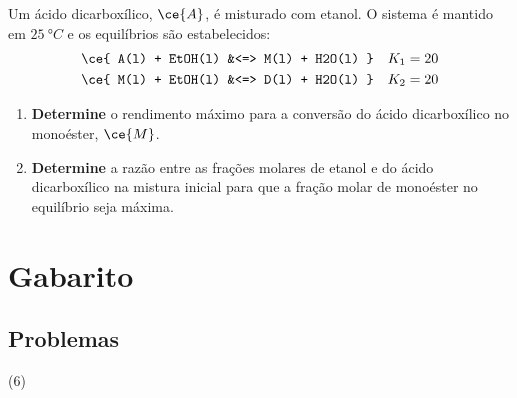 \begin{problem}[
	id={2F74},
	path={/home/braun/Documents/Developer/braunchem/data/problems/Q2/2F/2F74}
]
Um ácido dicarboxílico, {\(\ce{A}\)}, é misturado com etanol. O sistema é mantido em {\(\qty{25}{\unit{\degree C}}\)} e os equilíbrios são
estabelecidos: {\[
\begin{aligned}
    \ce{ A(l) + EtOH(l) &<=> M(l) + H2O(l) } && K_1 =
20 \\
    \ce{ M(l) + EtOH(l) &<=> D(l) + H2O(l) } && K_2 =
20
\end{aligned}
\]}

\begin{enumerate}
\def\labelenumi{\alph{enumi}.}
\tightlist
\item
  \textbf{Determine} o rendimento máximo para a conversão do ácido dicarboxílico no monoéster, {\(\ce{M}\)}.
\item
  \textbf{Determine} a razão entre as frações molares de etanol e do ácido dicarboxílico na mistura inicial para que a fração molar de monoéster no
  equilíbrio seja máxima.
\end{enumerate}

\end{problem}

\section*{Gabarito}

\subsection*{Problemas}
\small 
\begin{mcanswers}
[start = 1](6)\answer {}
\answer {}
\answer {}
\answer {}
\answer {}
\answer {}
\answer {}
\answer {}
\answer {}
\answer {}
\answer {}
\answer {}
\answer {}
\answer {}
\answer {}
\answer {}
\answer {}
\answer {}
\answer {}
\answer {}
\answer {}
\answer {}
\answer {}
\answer {}
\answer {}
\answer {}
\answer {}
\answer {}
\answer {}
\answer {}
\answer {}
\answer {}
\answer {}
\answer {}
\answer {}
\answer {}
\answer {}
\answer {}
\end{mcanswers}

